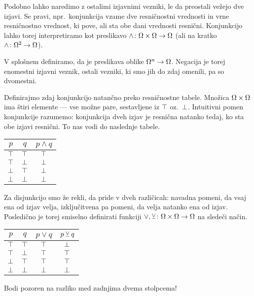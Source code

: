                 Podobno lahko naredimo z ostalimi izjavnimi vezniki, le da preostali vežejo dve izjavi. Se pravi, npr.~konjunkcija vzame dve resničnostni vrednosti in vrne resničnostno vrednost, ki pove, ali sta obe dani vrednosti resnični. Konjunkcijo lahko torej interpretiramo kot preslikavo $\land\colon \Omega \times \Omega \to \Omega$ (ali na kratko $\land\colon \Omega^2 \to \Omega$).

                V splošnem definiramo, da je  preslikava oblike $\Omega^n \to \Omega$. Negacija je torej enomestni izjavni veznik, ostali vezniki, ki smo jih do zdaj omenili, pa so dvomestni.

                Definirajmo zdaj konjunkcijo natančno preko resničnostne tabele. Množica $\Omega \times \Omega$ ima štiri elemente --- vse možne pare, sestavljene iz $\top$ oz.~$\bot$. Intuitivni pomen konjunkcije razumemo: konjunkcija dveh izjav je resnična natanko tedaj, ko sta obe izjavi resnični. To nas vodi do naslednje tabele.
                \begin{center}
                        \begin{tabular}{cc|c}
                                $p$ & $q$ & $p \land q$ \\
                                \hline
                                $\top$ & $\top$ & $\top$ \\
                                $\top$ & $\bot$ & $\bot$ \\
                                $\bot$ & $\top$ & $\bot$ \\
                                $\bot$ & $\bot$ & $\bot$
                        \end{tabular}
                \end{center}

                Za disjunkcijo smo že rekli, da pride v dveh različicah: navadna pomeni, da vsaj ena od izjav velja, izključitvena pa pomeni, da velja natanko ena od izjav. Posledično je torej smiselno definirati funkciji $\lor, \mathbin{\veebar}\colon \Omega \times \Omega \to \Omega$ na sledeči način.
                \begin{center}
                        \begin{tabular}{cc|cc}
                                $p$ & $q$ & $p \lor q$ & $p \mathbin{\veebar} q$ \\
                                \hline
                                $\top$ & $\top$ & $\top$ & $\bot$ \\
                                $\top$ & $\bot$ & $\top$ & $\top$ \\
                                $\bot$ & $\top$ & $\top$ & $\top$ \\
                                $\bot$ & $\bot$ & $\bot$ & $\bot$
                        \end{tabular}
                \end{center}
                Bodi pozoren na razliko med zadnjima dvema stolpcema!

